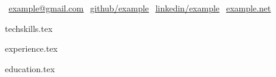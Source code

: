 \documentclass{resume} %
\newcommand*{\sectiondir}{_parts/}
\begin{document}
% 
%
{\centering
{}\selectfont
\hfill
\faEnvelope$~~$\underline{\href{mailto://example@gmail.com}{example@gmail.com}}
\hfill
\faGithub$~~$\underline{\href{https://github.com/example}{github/example}}
\hfill
\faLinkedinSquare$~~$\underline{\href{https://www.linkedin.com/in/example}{linkedin/example}}
\hfill
\faLink$~~$\underline{\href{https://example.net}{example.net}}
\par
\vspace{-0.5em}
}

%
%
{techskills.tex}

%
%
{experience.tex}

%
%
{education.tex}
\end{document}
